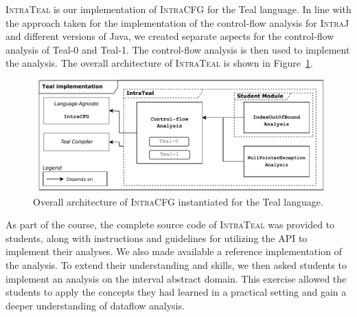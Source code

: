 \textsc{IntraTeal} is our implementation of \textsc{IntraCFG} for the Teal language. 
In line with the approach taken for the implementation of the control-flow analysis for \textsc{IntraJ} 
and different versions of Java, we created separate aspects for the 
control-flow analysis of Teal-0 and Teal-1.  The control-flow analysis is then 
used to implement the  analysis. The overall architecture of \textsc{IntraTeal} is
shown in Figure~\ref{fig:IntraTeal}.
\begin{figure}[H]
    \centering
    \includegraphics[scale=0.65]{kappa/img/architectureteal.pdf}
    \caption{\label{fig:IntraTeal} Overall architecture of \textsc{IntraCFG} instantiated for the Teal language.}
\end{figure}

As part of the course, the complete source code of \textsc{IntraTeal} was provided 
to students, along with instructions and guidelines for utilizing the API to implement 
their analyses. We also made available a reference implementation of the  
analysis. To extend their understanding and skills, we then asked students to implement 
an  analysis on the interval abstract domain. This exercise allowed the 
students to apply the concepts they had learned in a practical setting and gain a 
deeper understanding of dataﬂow analysis.

